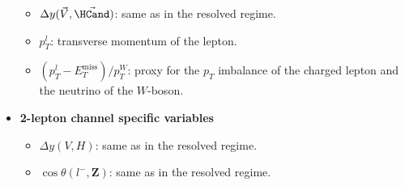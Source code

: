 \begin{itemize}
  \begin{itemize}
      \item $\Delta y(\vec{V},\vec{\HCand})$: same as in the resolved regime.
      \item $p_T^l$: transverse momentum of the lepton.
      \item $(p_T^{l} - E_T^{\textrm{miss}})/p_T^W$:  proxy for the $p_T$ imbalance of the charged lepton and the neutrino of the $W$-boson.
  \end{itemize}
  \item \textbf{2-lepton channel specific variables}
  \begin{itemize}
      \item $\Delta y(\textbf{$V$},\textbf{$H$})$: same as in the resolved regime.
      \item $\cos{\theta(\textbf{$l^-$},\textbf{Z})}$: same as in the resolved regime.
  \end{itemize}
\end{itemize}

\newpage


\clearpage

